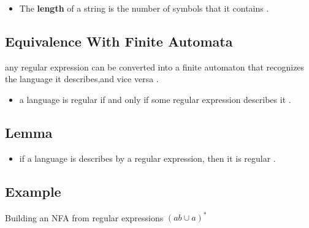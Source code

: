 \documentclass[12pt]{article}
\let\epsilon\varepsilon
\begin{document}
\begin{tcolorbox}
\begin{itemize}
	\item The \textbf{length} of a string is the number of symbols that it contains .
\end{itemize}
\end{tcolorbox}


\subsection{Equivalence With Finite Automata}
any regular expression can be converted into a finite automaton that recognizes the language it describes,and vice versa .

\begin{tcolorbox}
\begin{itemize}
	\item a language is regular if and only if some regular expression describes it .
\end{itemize}
\end{tcolorbox}


\subsection{Lemma}

\begin{tcolorbox}
\begin{itemize}
	\item if a language is describes by a regular expression, then it is regular .
\end{itemize}
\end{tcolorbox}

\subsection{Example}

Building an NFA from regular expressions $(ab \cup a)^{*}$


\begin{center}
\end{center}
\end{document}
